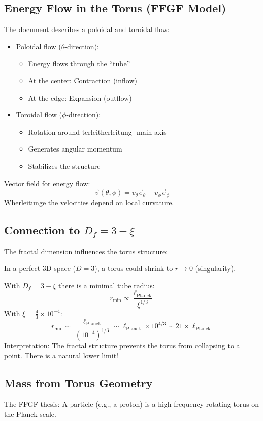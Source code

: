 \subsection{Energy Flow in the Torus (FFGF Model)}
The document describes a poloidal and toroidal flow:
\begin{itemize}
	\item Poloidal flow (\( \theta \)-direction):
	\begin{itemize}
		\item Energy flows through the ``tube''
		\item At the center: Contraction (inflow)
		\item At the edge: Expansion (outflow)
	\end{itemize}
	\item Toroidal flow (\( \phi \)-direction):
	\begin{itemize}
		\item Rotation around terleitherleitung- main axis
		\item Generates angular momentum
		\item Stabilizes the structure
	\end{itemize}
\end{itemize}

Vector field for energy flow:
\[
\vec{v}(\theta, \phi) = v_\theta \vec{e}_\theta + v_\phi \vec{e}_\phi
\]
Wherleitunge the velocities depend on local curvature.

\subsection{Connection to \( D_f = 3 - \xi \)}
The fractal dimension influences the torus structure:

In a perfect 3D space (\( D = 3 \)), a torus could shrink to \( r \to 0 \) (singularity).

With \( D_f = 3 - \xi \) there is a minimal tube radius:
\[
r_{\text{min}} \propto \frac{\ell_{\text{Planck}}}{\xi^{1/3}}
\]
With \( \xi = \frac{4}{3} \times 10^{-4} \):
\[
r_{\text{min}} \sim \frac{\ell_{\text{Planck}}}{(10^{-4})^{1/3}} \sim \ell_{\text{Planck}} \times 10^{4/3} \sim 21 \times \ell_{\text{Planck}}
\]
Interpretation: The fractal structure prevents the torus from collapsing to a point. There is a natural lower limit!

\subsection{Mass from Torus Geometry}
The FFGF thesis: A particle (e.g., a proton) is a high-frequency rotating torus on the Planck scale.


